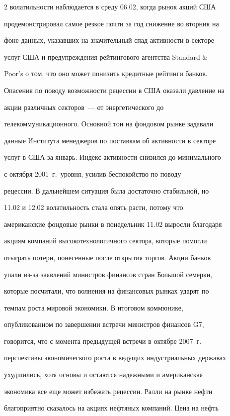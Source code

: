 \begin{multicols}{2}
волатильности наблюдается в среду 06.02, когда рынок акций США


продемонстрировал самое резкое почти за год снижение во вторник на


фоне данных, указавших на значительный спад активности в секторе


услуг США и предупреждения рейтингового агентства Standard \&


Poor's о том, что оно может понизить кредитные рейтинги банков.


Опасения по поводу возможности рецессии в США оказали давление на


акции различных секторов~--- от энергетического до


телекоммуникационного. Основной тон на фондовом рынке задавали


данные Института менеджеров по поставкам об активности в секторе


услуг в США за январь. Индекс активности снизился до минимального


с октября 2001~г.\ уровня, усилив беспокойство по поводу


рецессии. В дальнейшем ситуация была достаточно стабильной, но


11.02 и 12.02 волатильность стала опять расти, потому что


американские фондовые рынки в понедельник 11.02 выросли благодаря


акциям компаний высокотехнологичного сектора, которые помогли


отыграть потери, понесенные после открытия торгов. Акции банков


упали из-за заявлений министров финансов стран Большой семерки,


которые посчитали, что волнения на финансовых рынках ударят по


темпам роста мировой экономики. В итоговом коммюнике,


опубликованном по завершении встречи министров финансов G7,


говорится, что с момента предыдущей встречи в октябре 2007~г.\


перспективы экономического роста в ведущих индустриальных державах


ухудшились, хотя основы и остаются надежными и американская


экономика все еще может избежать рецессии. Ралли на рынке нефти


благоприятно сказалось на акциях нефтяных компаний. Цена на нефть



\end{multicols}
